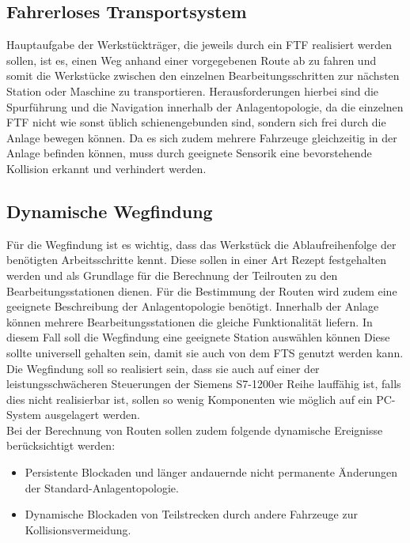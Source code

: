 \subsection{Fahrerloses Transportsystem}
	Hauptaufgabe der Werkstückträger, die jeweils durch ein \ac{FTF} realisiert werden sollen, ist es, einen Weg anhand einer vorgegebenen Route ab zu fahren und somit die Werkstücke zwischen den einzelnen Bearbeitungsschritten zur nächsten Station oder Maschine zu transportieren. Herausforderungen hierbei sind die Spurführung und die Navigation innerhalb der Anlagentopologie, da die einzelnen \ac{FTF} nicht wie sonst üblich schienengebunden sind, sondern sich frei durch die Anlage bewegen können. Da es sich zudem mehrere Fahrzeuge gleichzeitig in der Anlage befinden können, muss durch geeignete Sensorik eine bevorstehende Kollision erkannt und verhindert werden.
\subsection{Dynamische Wegfindung}
	\label{Aufgabenstellung_Pathfinding}
	Für die Wegfindung ist es wichtig, dass das Werkstück die Ablaufreihenfolge der benötigten Arbeitsschritte kennt. Diese sollen in einer Art Rezept festgehalten werden und als Grundlage für die Berechnung der Teilrouten zu den Bearbeitungsstationen dienen. Für die Bestimmung der Routen wird zudem eine geeignete Beschreibung der Anlagentopologie benötigt. Innerhalb der Anlage können mehrere Bearbeitungsstationen die gleiche Funktionalität liefern. In diesem Fall soll die Wegfindung eine geeignete Station auswählen können Diese sollte universell gehalten sein, damit sie auch von dem \ac{FTS} genutzt werden kann. Die Wegfindung soll so realisiert sein, dass sie auch auf einer der leistungsschwächeren Steuerungen der Siemens S7-1200er Reihe lauffähig ist, falls dies nicht realisierbar ist, sollen so wenig Komponenten wie möglich auf ein PC-System ausgelagert werden.
	\\ Bei der Berechnung von Routen sollen zudem folgende dynamische Ereignisse berücksichtigt werden:
	\begin{itemize}
		\item Persistente Blockaden und länger andauernde  nicht permanente Änderungen der Standard-Anlagentopologie.
		\item Dynamische Blockaden von Teilstrecken durch andere Fahrzeuge zur Kollisionsvermeidung.
	\end{itemize}
	
	

